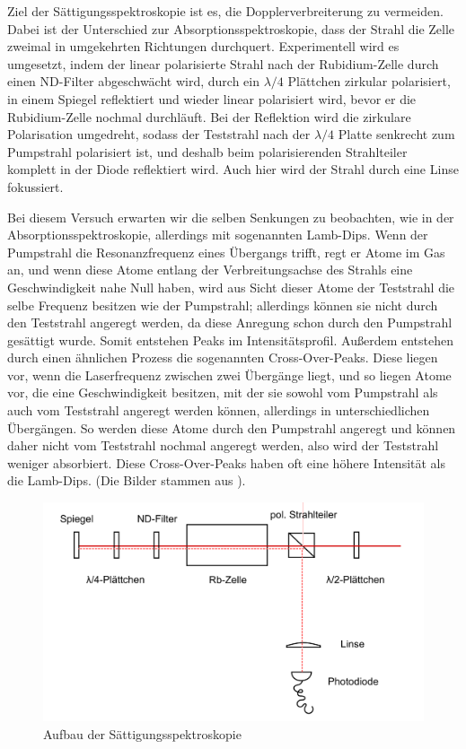 \documentclass[a4paper,parskip]{scrartcl}
\begin{document}
Ziel der Sättigungsspektroskopie ist es, die Dopplerverbreiterung zu vermeiden. Dabei ist der Unterschied zur Absorptionsspektroskopie, dass der Strahl die Zelle zweimal in umgekehrten Richtungen durchquert. Experimentell wird es umgesetzt, indem der linear polarisierte Strahl nach der Rubidium-Zelle durch einen ND-Filter abgeschwächt wird, durch ein $\lambda/4$ Plättchen zirkular polarisiert, in einem Spiegel reflektiert und wieder linear polarisiert wird, bevor er die Rubidium-Zelle nochmal durchläuft. Bei der Reflektion wird die zirkulare Polarisation umgedreht, sodass der Teststrahl nach der $\lambda/4$ Platte senkrecht zum Pumpstrahl polarisiert ist, und deshalb beim polarisierenden Strahlteiler komplett in der Diode reflektiert wird. Auch hier wird der Strahl durch eine Linse fokussiert.

Bei diesem Versuch erwarten wir die selben Senkungen zu beobachten, wie in der Absorptionsspektroskopie, allerdings mit sogenannten Lamb-Dips. Wenn der Pumpstrahl die Resonanzfrequenz eines Übergangs trifft, regt er Atome im Gas an, und wenn diese Atome entlang der Verbreitungsachse des Strahls eine Geschwindigkeit nahe Null haben, wird aus Sicht dieser Atome der Teststrahl die selbe Frequenz besitzen wie der Pumpstrahl; allerdings können sie nicht durch den Teststrahl angeregt werden, da diese Anregung schon durch den Pumpstrahl gesättigt wurde. Somit entstehen Peaks im Intensitätsprofil. Außerdem entstehen durch einen ähnlichen Prozess die sogenannten Cross-Over-Peaks. Diese liegen vor, wenn die Laserfrequenz zwischen zwei Übergänge liegt, und so liegen Atome vor, die eine Geschwindigkeit besitzen, mit der sie sowohl vom Pumpstrahl als auch vom Teststrahl angeregt werden können, allerdings in unterschiedlichen Übergängen. So werden diese Atome durch den Pumpstrahl angeregt und können daher nicht vom Teststrahl nochmal angeregt werden, also wird der Teststrahl weniger absorbiert. Diese Cross-Over-Peaks haben oft eine höhere Intensität als die Lamb-Dips. (Die Bilder stammen aus \cite{Ref:3}).

\begin{figure}[h]
\centering
\includegraphics[width=\textwidth]{Aufbau_2.png}
\caption{Aufbau der Sättigungsspektroskopie}
\end{figure}
\end{document}

